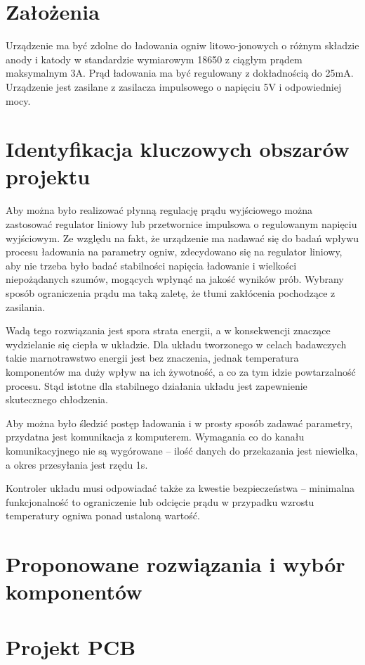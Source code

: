 \documentclass[polish,engineer]{polsl-msth}
\begin{document}
\section{Założenia}
Urządzenie ma być zdolne do ładowania ogniw litowo-jonowych o różnym składzie anody i katody w standardzie wymiarowym 18650 z ciągłym prądem maksymalnym 3A. Prąd ładowania ma być regulowany z dokładnością do 25mA. Urządzenie jest zasilane z zasilacza impulsowego o napięciu 5V i odpowiedniej mocy.
\section{Identyfikacja kluczowych obszarów projektu}
Aby można było realizować płynną regulację prądu wyjściowego można zastosować regulator liniowy lub przetwornice impulsowa o regulowanym napięciu wyjściowym. Ze względu na fakt, że urządzenie ma nadawać się do badań wpływu procesu ładowania na parametry ogniw, zdecydowano się na regulator liniowy, aby nie trzeba było badać stabilności napięcia ładowanie i wielkości niepożądanych szumów, mogących wpłynąć na jakość wyników prób. Wybrany sposób ograniczenia prądu ma taką zaletę, że tłumi zakłócenia pochodzące z zasilania.

Wadą tego rozwiązania jest spora strata energii, a w konsekwencji znaczące wydzielanie się ciepła w układzie. Dla układu tworzonego w celach badawczych takie marnotrawstwo energii jest bez znaczenia, jednak temperatura komponentów ma duży wpływ na ich żywotność, a co za tym idzie powtarzalność procesu. Stąd istotne dla stabilnego działania układu jest zapewnienie skutecznego chłodzenia.

Aby można było śledzić postęp ładowania i w prosty sposób zadawać parametry, przydatna jest komunikacja z komputerem. Wymagania co do kanału komunikacyjnego nie są wygórowane – ilość danych do przekazania jest niewielka, a okres przesyłania jest rzędu 1s.

Kontroler układu musi odpowiadać także za kwestie bezpieczeństwa – minimalna funkcjonalność to ograniczenie lub odcięcie prądu w przypadku wzrostu temperatury ogniwa ponad ustaloną wartość.

\section{Proponowane rozwiązania i wybór komponentów}
\section{Projekt PCB}
\end{document}
